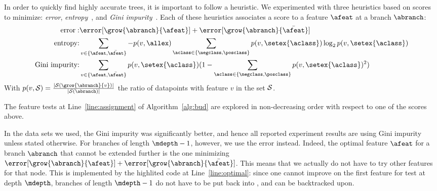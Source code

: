 \documentclass{llncs}
\begin{document}
In order to quickly find highly accurate trees, it is important to follow a heuristic. We experimented with three heuristics based on scores to minimize: \emph{error}, \emph{entropy}~\cite{10.1023/A:1022643204877}, and \emph{Gini impurity}~\cite{breiman1984classification}. 
Each of these heuristics associates a score to a feature $\afeat$ at a branch $\abranch$:
\begin{eqnarray}
	\textrm{error}: & \error[\grow{\abranch}{\afeat}] + \error[\grow{\abranch}{\bar{\afeat}}] \\
	\textrm{entropy:} & \sum\limits_{v \in \{\afeat,\bar{\afeat}\}} -p(v,\allex) \sum\limits_{\aclass \in \{\negclass,\posclass\}} p(v,\setex{\aclass}) \log_{2} p(v,\setex{\aclass}) \\
	\textrm{Gini impurity:} &  \sum\limits_{v \in \{\afeat,\bar{\afeat}\}} p(v,\setex{\aclass})(1 - \sum\limits_{\aclass \in \{\negclass,\posclass\}} p(v,\setex{\aclass})^2)
\end{eqnarray}
With $p(v,{\cal S}) = \frac{|{\cal S}(\grow{\abranch}{v})|}{|{\cal S}(\abranch)|}$ the ratio of datapoints with feature $v$ in the set ${\cal S}$.

The feature tests at Line~\ref{line:assignment} of Algorithm~\ref{alg:bud} are explored in non-decreasing order with respect to one of the scores above.


In the data sets we used, the Gini impurity was significantly better, and hence all reported experiment results are using Gini impurity unless stated otherwise. For branches of length $\mdepth-1$, however, we use the error instead. Indeed, the optimal feature $\afeat$ for a branch $\abranch$ that cannot be extended further is the one minimizing 
$\error[\grow{\abranch}{\afeat}] + \error[\grow{\abranch}{\bar{\afeat}}]$.
This means that we actually do not have to try other features for that node. This is implemented by the highlited code at Line~\ref{line:optimal}: since one cannot improve on the first feature for test at depth $\mdepth$, branches of length $\mdepth-1$ do not have to be put back into \bud, and can be backtracked upon.
\end{document}
